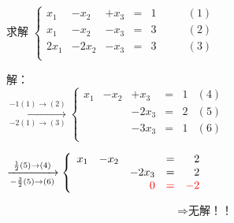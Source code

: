 \begin{frame}
\begin{example}[无解]
求解 $\left\{\begin{array}{rrrrrrr}
x_1 &  -x_2 & +x_3 & = & 1 &  \qquad (1)\\
x_1 &  -x_2 & -x_3 & = & 3 &  \qquad (2)\\
2x_1 & -2x_2 & -x_3 & = & 3 &  \qquad (3)\\
\end{array}\right.$
\end{example} \pp
{解：\\
$\xrightarrow[-2(1)\rightarrow(3)]{-1(1)\rightarrow(2)}
\left\{\begin{array}{rrrrrrr}
x_1 &  -x_2 & +x_3 & = & 1 &   (4)\\
&  & -2x_3 & = & 2 & (5)\\
&  & -3x_3 & = & 1 & (6)\\
\end{array}\right.$ \pp
\bigskip

$\xrightarrow[-\frac32(5)\rightarrow(6)]{\frac12(5)\rightarrow(4)}
\left\{\begin{array}{rrrrrrr}
x_1 &  -x_2 &  & = & 2 & \\
&  & -2x_3 & = & 2 & \\
&  & \red{0} & \red{=} & \red{-2} & \\
\end{array}\right.$ \pp
\bigskip

\[\Rightarrow \textbf{无解！！}\]
}
\end{frame}





